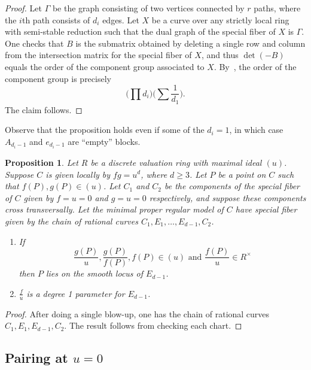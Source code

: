 \documentclass[reqno]{amsart}
\newtheorem{proposition}[thm]{Proposition}
\theoremstyle{definition}
\theoremstyle{remark}
\begin{document}
\begin{proof}
  Let $\Gamma$ be the graph consisting of two vertices connected by $r$ paths, where the $i$th path consists of $d_i$ edges. Let $X$ be a curve over any strictly local ring with semi-stable reduction such that the dual graph of the special fiber of $X$ is $\Gamma$. One checks that $B$ is the submatrix obtained by deleting a single row and column from the intersection matrix for the special fiber of $X$, and thus $\det (-B)$ equals the order of the component group associated to $X$. By~\cite[Prop.~9.6.10]{blr}, the order of the component group is precisely
  \[
  \bigg(\prod d_i\bigg)\bigg(\sum \frac{1}{d_1}\bigg).
  \]
  The claim follows.
\end{proof}
Observe that the proposition holds even if some of the $d_i = 1$, in which case $A_{d_i - 1}$ and $e_{d_i - 1}$ are ``empty'' blocks.

\begin{proposition}\label{prop:fg-equals-u-blow-up}
  Let $R$ be a discrete valuation ring with maximal ideal $(u)$. Suppose $C$ is given locally by $fg = u^d$, where $d \geq 3$. Let $P$ be a point on $C$ such that $f(P), g(P) \in (u)$. Let $C_1$ and $C_2$ be the components of the special fiber of $C$ given by $f = u = 0$ and $g = u = 0$ respectively, and suppose these components cross transversally. Let the minimal proper regular model of $C$ have special fiber given by the chain of rational curves $C_1, E_1, \dots, E_{d-1}, C_2$.
  \begin{enumerate}
      \item  If
  \[
  \frac{g(P)}{u}, \frac{g(P)}{f(P)}, f(P) \in (u) \text{ and } \frac{f(P)}{u} \in R^\times
  \]
  then $P$ lies on the smooth locus of $E_{d-1}$.
    \item $\frac{f}{u}$ is a degree 1 parameter for $E_{d-1}$.
  \end{enumerate}
\end{proposition}

\begin{proof}
  After doing a single blow-up, one has the chain of rational curves $C_1, E_1, E_{d-1}, C_2$. The result follows from checking each chart.
\end{proof}

\subsection{Pairing at $u = 0$}
\label{sec:pairing-at-u}
\end{document}
